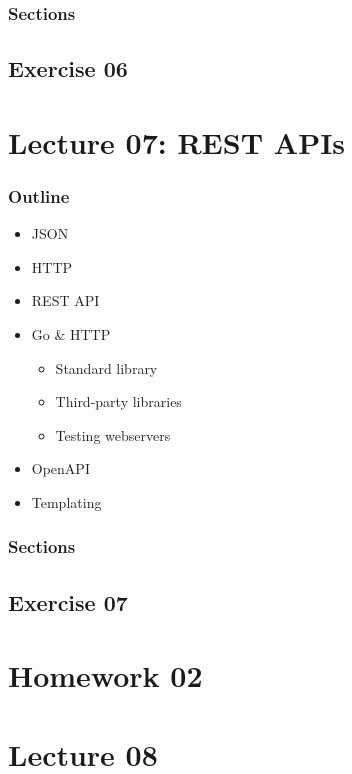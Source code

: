 \documentclass[
  digital,
  color,
  oneside,
  nosansbold,
  nocolorbold,
  lof,
  lot,
]{fithesis4}
\begin{document}
\subsubsection{Sections}

\subsection{Exercise 06}

\section{Lecture 07: REST APIs}

\subsubsection{Outline}

\begin{itemize}
    \item JSON
    \item HTTP
    \item REST API
    \item Go \& HTTP
    \begin{itemize}
        \item Standard library
        \item Third-party libraries
        \item Testing webservers
    \end{itemize}
    \item OpenAPI
    \item Templating
\end{itemize}

\subsubsection{Sections}

\subsection{Exercise 07}

\section{Homework 02}

\section{Lecture 08}
\end{document}
